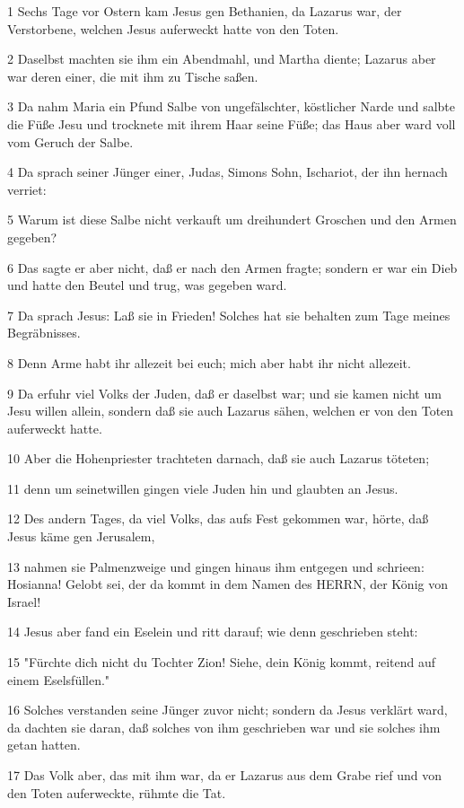 \par 1 Sechs Tage vor Ostern kam Jesus gen Bethanien, da Lazarus war, der Verstorbene, welchen Jesus auferweckt hatte von den Toten.
\par 2 Daselbst machten sie ihm ein Abendmahl, und Martha diente; Lazarus aber war deren einer, die mit ihm zu Tische saßen.
\par 3 Da nahm Maria ein Pfund Salbe von ungefälschter, köstlicher Narde und salbte die Füße Jesu und trocknete mit ihrem Haar seine Füße; das Haus aber ward voll vom Geruch der Salbe.
\par 4 Da sprach seiner Jünger einer, Judas, Simons Sohn, Ischariot, der ihn hernach verriet:
\par 5 Warum ist diese Salbe nicht verkauft um dreihundert Groschen und den Armen gegeben?
\par 6 Das sagte er aber nicht, daß er nach den Armen fragte; sondern er war ein Dieb und hatte den Beutel und trug, was gegeben ward.
\par 7 Da sprach Jesus: Laß sie in Frieden! Solches hat sie behalten zum Tage meines Begräbnisses.
\par 8 Denn Arme habt ihr allezeit bei euch; mich aber habt ihr nicht allezeit.
\par 9 Da erfuhr viel Volks der Juden, daß er daselbst war; und sie kamen nicht um Jesu willen allein, sondern daß sie auch Lazarus sähen, welchen er von den Toten auferweckt hatte.
\par 10 Aber die Hohenpriester trachteten darnach, daß sie auch Lazarus töteten;
\par 11 denn um seinetwillen gingen viele Juden hin und glaubten an Jesus.
\par 12 Des andern Tages, da viel Volks, das aufs Fest gekommen war, hörte, daß Jesus käme gen Jerusalem,
\par 13 nahmen sie Palmenzweige und gingen hinaus ihm entgegen und schrieen: Hosianna! Gelobt sei, der da kommt in dem Namen des HERRN, der König von Israel!
\par 14 Jesus aber fand ein Eselein und ritt darauf; wie denn geschrieben steht:
\par 15 "Fürchte dich nicht du Tochter Zion! Siehe, dein König kommt, reitend auf einem Eselsfüllen."
\par 16 Solches verstanden seine Jünger zuvor nicht; sondern da Jesus verklärt ward, da dachten sie daran, daß solches von ihm geschrieben war und sie solches ihm getan hatten.
\par 17 Das Volk aber, das mit ihm war, da er Lazarus aus dem Grabe rief und von den Toten auferweckte, rühmte die Tat.
